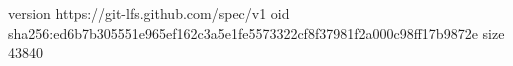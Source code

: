 version https://git-lfs.github.com/spec/v1
oid sha256:ed6b7b305551e965ef162c3a5e1fe5573322cf8f37981f2a000c98ff17b9872e
size 43840
